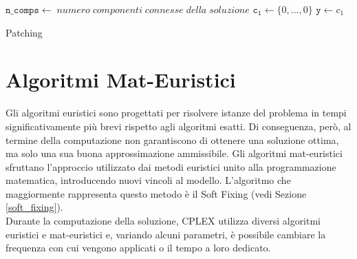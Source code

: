 \begin{algorithm}[h]
\DontPrintSemicolon
{}
\BlankLine
$\mathtt{n\_comps \gets} \;numero\; componenti\; connesse \;della\; soluzione$\;
\BlankLine
$\mathtt{c_1\gets}\{0,...,0\}$\;
\BlankLine
{}
$\mathtt{y \gets} c_1$\;
\caption{Patching}
\end{algorithm}

\section{Algoritmi Mat-Euristici}
Gli algoritmi euristici sono progettati per risolvere istanze del problema in tempi significativamente più brevi rispetto agli algoritmi esatti. Di conseguenza, però, al termine della computazione non garantiscono di ottenere una soluzione ottima, ma solo una sua buona approssimazione ammissibile. Gli algoritmi mat-euristici sfruttano l'approccio utilizzato dai metodi euristici unito alla programmazione matematica, introducendo nuovi vincoli al modello. L'algoritmo che maggiormente rappresenta questo metodo è il Soft Fixing (vedi Sezione \ref{soft_fixing}). \\
Durante la computazione della soluzione, CPLEX utilizza diversi algoritmi euristici e mat-euristici e, variando alcuni parametri, è possibile cambiare la frequenza con cui vengono applicati o il tempo a loro dedicato. 

